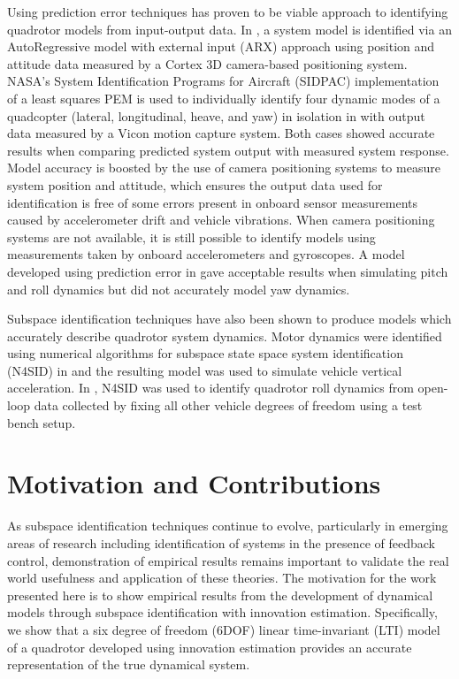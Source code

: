 Using prediction error techniques has proven to be viable approach to identifying quadrotor models from input-output data. In \cite{chamberlain2011system}, a system model is identified via an AutoRegressive model with external input (ARX) approach using position and attitude data measured by a Cortex 3D camera-based positioning system. NASA's System Identification Programs for Aircraft (SIDPAC) implementation of a least squares PEM is used to individually identify four dynamic modes of a quadcopter (lateral, longitudinal, heave, and yaw) in isolation in \cite{miller2011open} with output data measured by a Vicon motion capture system. Both cases showed accurate results when comparing predicted system output with measured system response. Model accuracy is boosted by the use of camera positioning systems to measure system position and attitude, which ensures the output data used for identification is free of some errors present in onboard sensor measurements caused by accelerometer drift and vehicle vibrations. When camera positioning systems are not available, it is still possible to identify models using measurements taken by onboard accelerometers and gyroscopes.  A model developed using prediction error in \cite{lee2011attitude} gave acceptable results when simulating pitch and roll dynamics but did not accurately model yaw dynamics.

Subspace identification techniques have also been shown to produce models which accurately describe quadrotor system dynamics. Motor dynamics were identified using numerical algorithms for subspace state space system identification (N4SID) in \cite{kis2011sensor} and the resulting model was used to simulate vehicle vertical acceleration. In \cite{batmazdesign}, N4SID was used to identify quadrotor roll dynamics from open-loop data collected by fixing all other vehicle degrees of freedom using a test bench setup. 


\section{Motivation and Contributions}
As subspace identification techniques continue to evolve, particularly in emerging areas of research including identification of systems in the presence of feedback control, demonstration of empirical results remains important to validate the real world usefulness and application of these theories. The motivation for the work presented here is to show empirical results from the development of dynamical models through subspace identification with innovation estimation. Specifically, we show that a six degree of freedom (6DOF) linear time-invariant (LTI) model of a quadrotor developed using innovation estimation provides an accurate representation of the true dynamical system.




